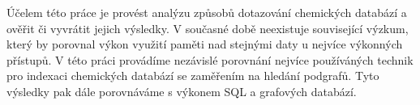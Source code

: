 \documentclass[]{article}
\begin{document}
	
	Účelem této práce je provést analýzu způsobů dotazování chemických databází a ověřit či vyvrátit jejich výsledky. V současné době neexistuje související výzkum, který by porovnal výkon využití paměti nad stejnými daty u nejvíce výkonných přístupů. V této práci provádíme nezávislé porovnání nejvíce používáných technik pro indexaci chemických databází se zaměřením na hledání podgrafů. Tyto výsledky pak dále porovnáváme s výkonem SQL a grafových databází.
\end{document}
